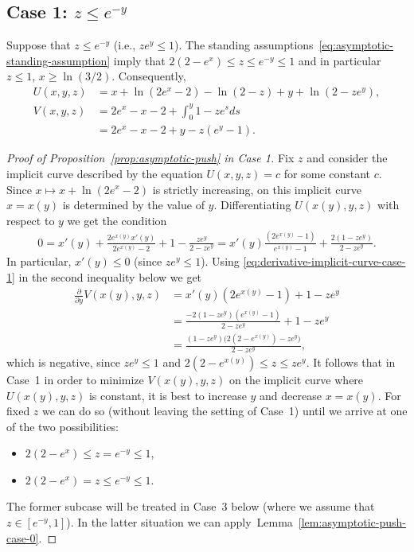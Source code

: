 \documentclass[a4paper]{amsart} %
\theoremstyle{definition}
\theoremstyle{remark}
\numberwithin{equation}{section}
\newcommand*{\XXXasymptoticDenominator}{V}
\newcommand*{\XXXasymptoticNominator}{U}
\begin{document}
\subsection{Case 1: \texorpdfstring{$z\leq e^{-y}$}{z leq exp(-y)}}
	Suppose that $z\leq e^{-y}$ (i.e., $ze^y \leq 1$).
	The standing assumptions~\eqref{eq:asymptotic-standing-assumption} imply   that
	$
	2(2-e^x) \leq z \leq e^{-y} \leq 1
	$
	and in particular $z\leq 1$, $x\geq \ln(3/2)$.
	Consequently, 
	\begin{align*}
	\XXXasymptoticNominator(x,y,z) &= x + \ln(2e^x-2) - \ln(2-z) + y + \ln(2-ze^y),\\
	\XXXasymptoticDenominator(x,y,z) &= 2e^x - x -2 + \int_{0}^{y} 1 -  z  e^{s} ds\\
	& = 2e^x - x- 2 + y - z(e^y-1).
	\end{align*}
\begin{proof}[Proof of Proposition~\ref{prop:asymptotic-push} in Case 1]
	Fix $z$ and consider the implicit curve described by the equation $\XXXasymptoticNominator(x,y,z) = c$ for some constant $c$. Since $x\mapsto x + \ln(2e^x - 2)$ is strictly increasing, on this implicit curve
	$x=x(y)$ is determined by the value of $y$.
	Differentiating $\XXXasymptoticNominator(x(y),y,z)$ with respect to $y$ we
	get the condition
	\begin{align}
	\label{eq:derivative-implicit-curve-case-1}
	0 = x'(y) + \frac{2e^{x(y)} x'(y)}{2e^{x(y)} - 2} + 1 - \frac{ze^y}{2-ze^y}
	= x'(y) \frac{(2 e^{x(y)}-1)}{e^{x(y)} - 1} + \frac{2(1-ze^y)}{2-ze^y}.
	\end{align}
	In particular, $x'(y)\leq 0$ (since $ze^y \leq 1$).
	Using \eqref{eq:derivative-implicit-curve-case-1} in the second inequality below we get
	\begin{align*}
	\frac{\partial}{\partial y} \XXXasymptoticDenominator(x(y), y, z) 
	&= x'(y)(2e^{x(y)} - 1) + 1 - z e^y \\
	&= \frac{-2(1-ze^y)(e^{x(y)} - 1)}{2-ze^y} + 1 - ze^{y}\\
	&= \frac{(1-ze^y)\bigl(2(2-e^{x(y)}) -ze^y\bigr)}{2-ze^y},
	\end{align*}
	which is negative,  since $ze^{y} \leq 1$ and $2(2-e^{x(y)}) \leq z \leq ze^y$.
	It follows that in Case~1 in order to minimize 
	$\XXXasymptoticDenominator(x(y),y,z) $ on the implicit curve where $\XXXasymptoticNominator(x(y),y,z) $ is constant,
	it is best to increase $y$ and decrease $x=x(y)$.
	For fixed $z$ we can do so (without leaving the setting of Case~1) until we arrive at one of the two possibilities:
	\begin{itemize}
		\item $2(2-e^x) \leq  z = e^{-y} \leq 1$,
		\item $2(2-e^x) = z \leq e^{-y} \leq 1$.
	\end{itemize}
	The former subcase will be treated in Case~3 below (where we assume that $z\in [e^{-y}, 1]$). 	
	In the latter situation we can apply~Lemma~\ref{lem:asymptotic-push-case-0}. 
	\end{proof}
	
\end{document}
